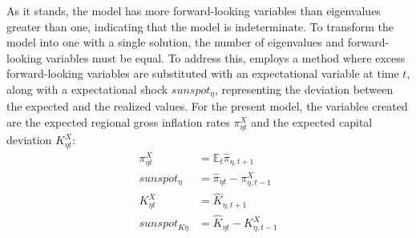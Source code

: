 \documentclass[../thesis.tex]{subfiles}
\begin{document}
As it stands, the model has more forward-looking variables than eigenvalues greater than one, indicating that the model is indeterminate. To transform the model into one with a single solution, the number of eigenvalues and forward-looking variables must be equal. To address this, \textcite{farmer_solving_2015} employs a method where excess forward-looking variables are substituted with an expectational variable at time $t$, along with a expectational shock $sunspot_{\eta}$, representing the deviation between the expected and the realized values. For the present model, the variables created are the expected regional gross inflation rates $\pi_{\eta t}^{X}$ and the expected capital deviation $K_{\eta t}^{X}$:
\begin{align}
	\pi_{\eta t}^{X} &= \mathbb{E}_t \hat{\pi}_{\eta, t+1} \label{eq_v2:reg-pix} \\
	sunspot_{\eta} &= \hat{\pi}_{\eta t} - \pi_{\eta, t-1}^{X} \label{eq_v2:sunspot} \\
	K_{\eta t}^{X} &= \hat{K}_{\eta, t+1} \label{eq_v2:reg-capital-x} \\
	sunspot_{K\eta} &= \hat{K}_{\eta t} - K_{\eta, t-1}^{X} \label{eq_v2:sunspot-k}
\end{align}
\end{document}

